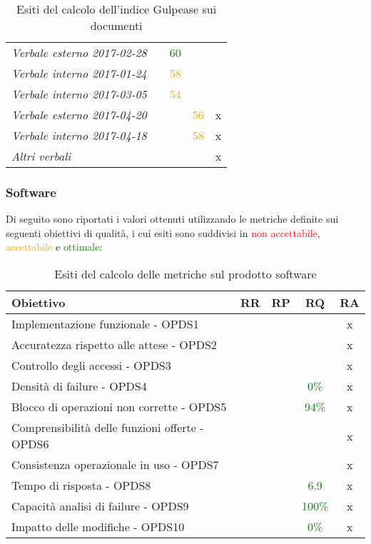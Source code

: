 \documentclass[PdQ.tex]{subfiles}
\begin{document}
\begin{table}[h]
\begin{tabular}{l c c c c}
					\rule[0cm]{0cm}{0.4cm}
					\textit{Verbale esterno 2017-02-28} & & \textcolor{green}{60} & &\\
					\rule[0cm]{0cm}{0.4cm}
					\textit{Verbale interno 2017-01-24} & & \textcolor{orange}{58} & &\\
					\rule[0cm]{0cm}{0.4cm}
					\textit{Verbale interno 2017-03-05} & & \textcolor{orange}{54} & &\\
					\rule[0cm]{0cm}{0.4cm}
					\textit{Verbale esterno 2017-04-20} & & & \textcolor{orange}{56} & x\\
					\rule[0cm]{0cm}{0.4cm}
					\textit{Verbale interno 2017-04-18} & & & \textcolor{orange}{58} & x\\
					\rule[0cm]{0cm}{0.4cm}
					\textit{Altri verbali} & & & & x\\
					\hline
				\end{tabular}
				\caption{Esiti del calcolo dell'indice Gulpease sui documenti}
			\end{table}
	\subsubsection{Software}
	Di seguito sono riportati i valori ottenuti utilizzando le metriche definite sui seguenti obiettivi di qualità, i cui esiti sono suddivisi in \textcolor{red}{non accettabile}, \textcolor{orange}{accettabile} e \textcolor{green}{ottimale}:
	\begin{table}[h]
				\centering
				\begin{tabular}{l c c c c}
					\hline
					\rule[-0.3cm]{0cm}{0.8cm}
					\textbf{Obiettivo} & \textbf{RR} & \textbf{RP} & \textbf{RQ}& \textbf{RA}\\
					\hline
					\rule[0cm]{0cm}{0.4cm}
					Implementazione funzionale - OPDS1 & & & & x \\
					\rule[0cm]{0cm}{0.4cm}
					Accuratezza rispetto alle attese - OPDS2 & & & & x \\
					\rule[0cm]{0cm}{0.4cm}
					Controllo degli accessi - OPDS3 & & & & x \\
					\rule[0cm]{0cm}{0.4cm}
					Densità di failure - OPDS4 & & & \textcolor{green}{0\%} & x \\
					\rule[0cm]{0cm}{0.4cm}
					Blocco di operazioni non corrette - OPDS5 & & & \textcolor{green}{94\%} & x\\
					\rule[0cm]{0cm}{0.4cm}
					Comprensibilità delle funzioni offerte - OPDS6 & & & & x \\
					\rule[0cm]{0cm}{0.4cm}
					Consistenza operazionale in uso - OPDS7 & & & & x \\
					\rule[0cm]{0cm}{0.4cm}
					Tempo di risposta - OPDS8 & & & \textcolor{green}{6.9} & x\\
					\rule[0cm]{0cm}{0.4cm}
					Capacità analisi di failure - OPDS9 & & & \textcolor{green}{100\%} & x\\
					\rule[0cm]{0cm}{0.4cm}
					Impatto delle modifiche - OPDS10 & & & \textcolor{green}{0\%} & x\\
					\hline
				\end{tabular}
				\caption{Esiti del calcolo delle metriche sul prodotto software}
			\end{table}
\end{document}
